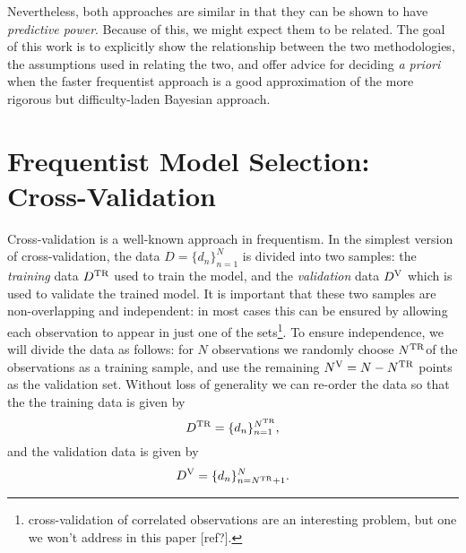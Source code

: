 \documentclass[12pt,pdftex]{article}
\newcommand{\comment}[1]{{\color{red} [#1]}}
\newcommand{\Dtr}{\ensuremath{D^{\rm TR}}}
\newcommand{\Dva}{\ensuremath{D^{\rm V}}}
\newcommand{\Ntr}{\ensuremath{N^{\rm TR}}}
\newcommand{\Nva}{\ensuremath{N^{\rm V}}}
\begin{document}
Nevertheless, both approaches are similar in that they can be shown to
have {\it predictive power}.  Because of this, we might expect them to
be related.  The goal of this work is to explicitly show the relationship
between the two methodologies, the assumptions used in relating the two,
and offer advice for deciding {\it a priori} when the faster frequentist
approach is a good approximation of the more rigorous but difficulty-laden
Bayesian approach.

\section{Frequentist Model Selection: Cross-Validation}
Cross-validation is a well-known approach in frequentism.  In the simplest
version of cross-validation, the data $D = \{d_n\}_{n=1}^N$
is divided into two samples:
the {\it training} data \Dtr{} used to train the model, and the
{\it validation} data \Dva{} which is used to validate the trained
model. It is important that these two samples are
non-overlapping and independent: in most cases this can be ensured by
allowing each observation to appear in just one of the sets\footnote{
 cross-validation of correlated observations are
 an interesting problem, but one we won't address in this paper
 \comment{ref?}.}.
To ensure independence, we will divide the data as follows: for $N$
observations we randomly choose \Ntr of the observations
as a training sample, and use the remaining $\Nva = N - \Ntr$
points as the validation set.
Without loss of generality we can re-order the data so that the
the training data is given by
\begin{equation}
  \Dtr = \{d_n\}_{n=1}^{\Ntr},
\end{equation}
and the validation data is given by
\begin{equation}
  \Dva = \{d_n\}_{n=\Ntr+1}^{N}.
\end{equation}
\end{document}
